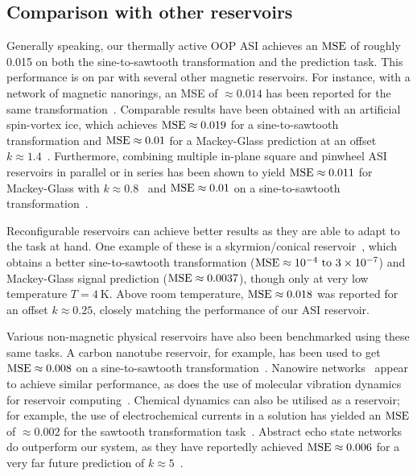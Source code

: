 \subsection{Comparison with other reservoirs}
Generally speaking, our thermally active OOP ASI achieves an $\mathrm{MSE}$ of roughly 0.015 on both the sine-to-sawtooth transformation and the  prediction task.
This performance is on par with several other magnetic reservoirs.
For instance, with a network of magnetic nanorings, an MSE of $\approx 0.014$ has been reported for the same transformation~\cite{Vidamour2023}.
Comparable results have been obtained with an artificial spin-vortex ice, which achieves $\mathrm{MSE} \approx 0.019$ for a sine-to-sawtooth transformation and $\mathrm{MSE} \approx 0.01$ for a Mackey-Glass prediction at an offset $k \approx 1.4$~\cite{gartside2022reconfigurable}.
Furthermore, combining multiple in-plane square and pinwheel ASI reservoirs in parallel or in series has been shown to yield $\mathrm{MSE} \approx 0.011$ for Mackey-Glass with $k \approx 0.8$~\cite{NeuromorphicFewShot} and $\mathrm{MSE} \approx 0.01$ on a sine-to-sawtooth transformation~\cite{AdaptiveProgrammableRC}. \par
Reconfigurable reservoirs can achieve better results as they are able to adapt to the task at hand.
One example of these is a skyrmion/conical reservoir~\cite{TaskAdaptivePRC}, which obtains a better sine-to-sawtooth transformation ($\MSE \approx \SIrange{e-4}{3e-7}{}$) and Mackey-Glass signal prediction ($\mathrm{MSE} \approx 0.0037$), though only at very low temperature $T = \SI{4}{\kelvin}$.
Above room temperature, $\mathrm{MSE} \approx 0.018$ was reported for an offset $k \approx 0.25$, closely matching the performance of our ASI reservoir. \par
Various non-magnetic physical reservoirs have also been benchmarked using these same tasks.
A carbon nanotube reservoir, for example, has been used to get $\mathrm{MSE} \approx 0.008$ on a sine-to-sawtooth transformation~\cite{CarbonNanotubeRC}.
Nanowire networks~\cite{NanoarchitectonicAtomicSwitch,RC_NNN} appear to achieve similar performance, as does the use of molecular vibration dynamics for reservoir computing~\cite{FewMoleculeReservoir}.
Chemical dynamics can also be utilised as a reservoir; for example, the use of electrochemical currents in a solution has yielded an $\mathrm{MSE}$ of $\approx 0.002$ for the sawtooth transformation task~\cite{ElectrochemicalPRC}. %
Abstract echo state networks do outperform our system, as they have reportedly achieved $\mathrm{MSE} \approx 0.006$ for a very far future prediction of $k \approx 5$~\cite{Moon_2021}. %

